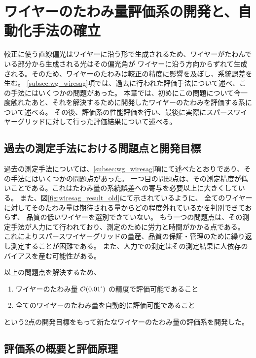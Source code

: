 \documentclass[../../main.tex]{subfiles}
\begin{document}
\chapter{ワイヤーのたわみ量評価系の開発と、自動化手法の確立}
\label{chap:wiresag}
較正に使う直線偏光はワイヤーに沿う形で生成されるため、ワイヤーがたわんでいる部分から生成される光はその偏光角が
ワイヤーに沿う方向からずれて生成される。そのため、ワイヤーのたわみは較正の精度に影響を及ぼし、系統誤差を生む。
\ref{subsec:wg_wiresag}項では、過去に行われた評価手法について述べ、この手法にはいくつかの問題があった。
本章では、初めにこの問題について今一度触れたあと、それを解決するために開発したワイヤーのたわみを評価する系について述べる。
その後、評価系の性能評価を行い、最後に実際にスパースワイヤーグリッドに対して行った評価結果について述べる。

\section{過去の測定手法における問題点と開発目標}

過去の測定手法については、\ref{subsec:wg_wiresag}項にて述べたとおりであり、その手法にはいくつかの問題点があった。
一つ目の問題点は、その測定精度が低いことである。これはたわみ量の系統誤差への寄与を必要以上に大きくしている。
また、図\ref{fig:wiresag_result_old}にて示されているように、
全てのワイヤーに対してそのたわみ量は期待される量からどの程度外れているかを判別できておらず、
品質の低いワイヤーを選別できていない。
もう一つの問題点は、その測定手法が人力にて行われており、測定のために労力と時間がかかる点である。
これによりスパースワイヤーグリッドの量産、品質の保証・管理のために繰り返し測定することが困難である。
また、人力での測定はその測定結果に人依存のバイアスを産む可能性がある。

以上の問題点を解決するため、
\begin{enumerate}
    \item ワイヤーのたわみ量 $\order{0.01\tcdegree}$ の精度で評価可能であること
    \item 全てのワイヤーのたわみ量を自動的に評価可能であること
\end{enumerate}
という2点の開発目標をもって新たなワイヤーのたわみ量の評価系を開発した。

\section{評価系の概要と評価原理}
\end{document}
